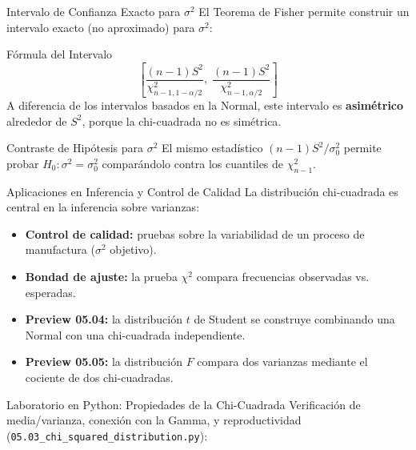 \documentclass[10pt, aspectratio=169]{beamer}
\begin{document}
\begin{frame}{Intervalo de Confianza Exacto para $\sigma^2$}
  \footnotesize
  El Teorema de Fisher permite construir un intervalo exacto (no aproximado) para $\sigma^2$: \pause

  \vspace{0.1cm}
  \begin{block}{Fórmula del Intervalo}
    $$\left[\dfrac{(n-1)S^2}{\chi^2_{n-1,1-\alpha/2}},\; \dfrac{(n-1)S^2}{\chi^2_{n-1,\alpha/2}}\right]$$
    A diferencia de los intervalos basados en la Normal, este intervalo es \textbf{asimétrico} alrededor de $S^2$, porque la chi-cuadrada no es simétrica.
  \end{block}

  \vspace{0.1cm}
  \pause
  \begin{alertblock}{Contraste de Hipótesis para $\sigma^2$}
    El mismo estadístico $(n-1)S^2/\sigma_0^2$ permite probar $H_0:\sigma^2=\sigma_0^2$ comparándolo contra los cuantiles de $\chi^2_{n-1}$.
  \end{alertblock}
\end{frame}

\begin{frame}{Aplicaciones en Inferencia y Control de Calidad}
  \footnotesize
  La distribución chi-cuadrada es central en la inferencia sobre varianzas: \pause

  \vspace{0.15cm}
  \begin{itemize}\itemsep=0.12cm
    \item \textbf{Control de calidad:} pruebas sobre la variabilidad de un proceso de manufactura ($\sigma^2$ objetivo). \pause
    \item \textbf{Bondad de ajuste:} la prueba $\chi^2$ compara frecuencias observadas vs. esperadas. \pause
    \item \textbf{Preview 05.04:} la distribución $t$ de Student se construye combinando una Normal con una chi-cuadrada independiente. \pause
    \item \textbf{Preview 05.05:} la distribución $F$ compara dos varianzas mediante el cociente de dos chi-cuadradas.
  \end{itemize}
\end{frame}

\begin{frame}[fragile]{Laboratorio en Python: Propiedades de la Chi-Cuadrada}
  \scriptsize
  Verificación de media/varianza, conexión con la Gamma, y reproductividad (\texttt{05.03\_chi\_squared\_distribution.py}):
  {
  }
\end{frame}
\end{document}
